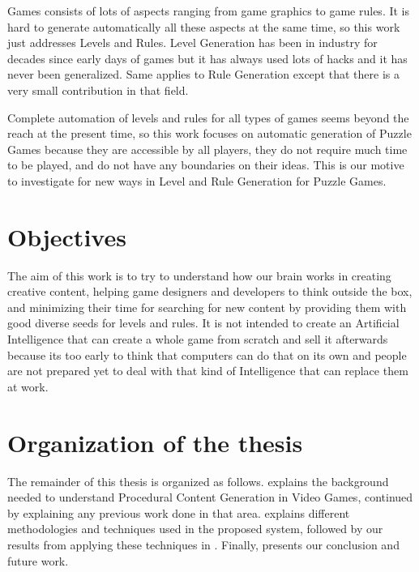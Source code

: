 Games consists of lots of aspects ranging from game graphics to game rules. It is hard to generate automatically all these aspects at the same time, so this work just addresses Levels and Rules. Level Generation has been in industry for decades since early days of games \cite{pcgFirstGame} but it has always used lots of hacks and it has never been generalized. Same applies to Rule Generation except that there is a very small contribution in that field.\\\par

Complete automation of levels and rules for all types of games seems beyond the reach at the present time, so this work focuses on automatic generation of Puzzle Games because they are accessible by all players, they do not require much time to be played, and do not have any boundaries on their ideas. This is our motive to investigate for new ways in Level and Rule Generation for Puzzle Games.

\section{Objectives}
The aim of this work is to try to understand how our brain works in creating creative content, helping game designers and developers to think outside the box, and minimizing their time for searching for new content by providing them with good diverse seeds for levels and rules. It is not intended to create an Artificial Intelligence that can create a whole game from scratch and sell it afterwards because its too early to think that computers can do that on its own and people are not prepared yet to deal with that kind of Intelligence that can replace them at work.


\section{Organization of the thesis}
The remainder of this thesis is organized as follows.  explains the background needed to understand Procedural Content Generation in Video Games, continued by  explaining any previous work done in that area.  explains different methodologies and techniques used in the proposed system, followed by our results from applying these techniques in . Finally,  presents our conclusion and future work.